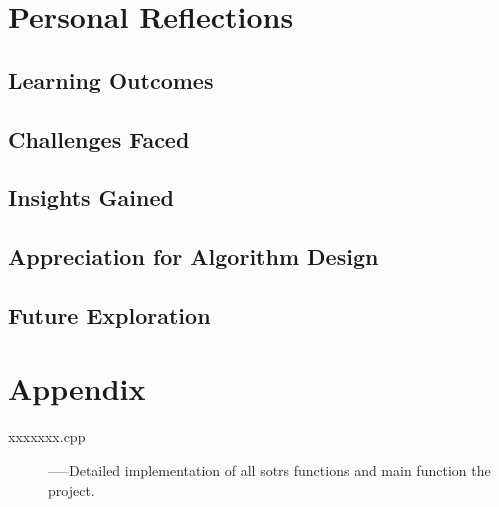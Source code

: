 \documentclass[12pt,a4paper]{article}
\begin{document}
%
%
\section{Personal Reflections}

\subsection{Learning Outcomes}

\subsection{Challenges Faced}

\subsection{Insights Gained}

\subsection{Appreciation for Algorithm Design}

\subsection{Future Exploration}

\section{Appendix}
\begin{description}
  \item[xxxxxxx.cpp] -----Detailed implementation of all sotrs functions and main function the project.
\end{description}
\end{document}
